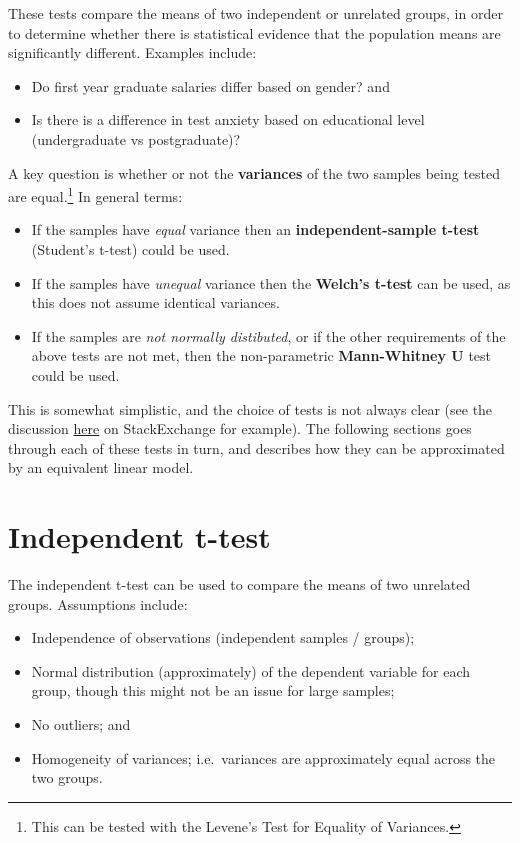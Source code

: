 \documentclass[
  12pt,
]{krantz}
\providecommand{\tightlist}{%
  \setlength{\itemsep}{0pt}\setlength{\parskip}{0pt}}
\begin{document}
These tests compare the means of two independent or unrelated groups, in order to determine whether there is statistical evidence that the population means are significantly different. Examples include:

\begin{itemize}
\tightlist
\item
  Do first year graduate salaries differ based on gender? and
\item
  Is there is a difference in test anxiety based on educational level (undergraduate vs postgraduate)?
\end{itemize}

A key question is whether or not the \textbf{variances} of the two samples being tested are equal.\footnote{This can be tested with the Levene's Test for Equality of Variances.} In general terms:

\begin{itemize}
\tightlist
\item
  If the samples have \emph{equal} variance then an \textbf{independent-sample t-test} (Student's t-test) could be used.
\item
  If the samples have \emph{unequal} variance then the \textbf{Welch's t-test} can be used, as this does not assume identical variances.
\item
  If the samples are \emph{not normally distibuted}, or if the other requirements of the above tests are not met, then the non-parametric \textbf{Mann-Whitney U} test could be used.
\end{itemize}

This is somewhat simplistic, and the choice of tests is not always clear (see the discussion \href{https://stats.stackexchange.com/questions/121852/how-to-choose-between-t-test-or-non-parametric-test-e-g-wilcoxon-in-small-sampl}{here} on StackExchange for example). The following sections goes through each of these tests in turn, and describes how they can be approximated by an equivalent linear model.

\hypertarget{independent-t-test}{%
\section{Independent t-test}\label{independent-t-test}}

The independent t-test can be used to compare the means of two unrelated groups. Assumptions include:

\begin{itemize}
\tightlist
\item
  Independence of observations (independent samples / groups);
\item
  Normal distribution (approximately) of the dependent variable for each group, though this might not be an issue for large samples;
\item
  No outliers; and
\item
  Homogeneity of variances; i.e.~variances are approximately equal across the two groups.
\end{itemize}
\end{document}
